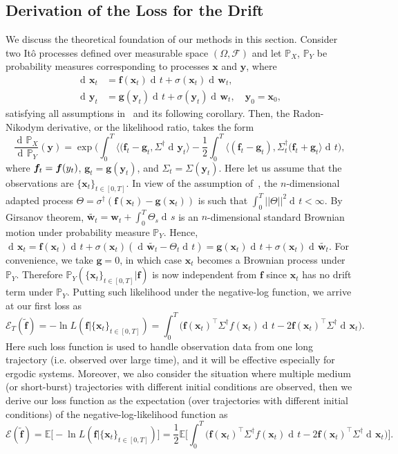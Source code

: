\documentclass[11pt]{article} %
\def\ry{{\textnormal{y}}}
\def\rvw{{\mathbf{w}}}
\def\rvx{{\mathbf{x}}}
\def\rvy{{\mathbf{y}}}
\def\vf{{\bm{f}}}
\def\vg{{\bm{g}}}
\newcommand{\E}{\mathbb{E}}
\DeclareMathOperator{\dif}{d \!}        %
\newcommand{\inp}[1]{\langle #1 \rangle}
\newcommand{\norm}[1]{||#1||}
\newcommand{\loss}{\mathcal{E}}
\begin{document}
\subsection{Derivation of the Loss for the Drift}\label{sec:theory}
%
We discuss the theoretical foundation of our methods in this section. Consider two It\^o processes defined over measurable space $(\Omega, \mathcal{F})$ and let $\mathbb{P}_X$, $\mathbb{P}_Y$ be probability measures corresponding to processes $\rvx$ and $\rvy$, where
\[
\begin{aligned}
  \dif \rvx_t &= \vf(\rvx_t)\dif t + \sigma(\rvx_t)\dif \rvw_t, \\
  \dif \rvy_t &= \vg(\rvy_t)\dif t + \sigma(\rvy_t)\dif \rvw_t, \quad \rvy_0 = \rvx_0,
\end{aligned}
\]
satisfying all assumptions in~\citep[Theorem~7.18]{liptser2001statistics} and its following corollary. Then, the Radon-Nikodym derivative, or the likelihood ratio, takes the form
\begin{equation}
\frac{\dif \mathbb{P}_X}{\dif \mathbb{P}_Y}(\rvy) = \exp \Big( \int_0^T \inp{(\vf_t - \vg_t, \Sigma^{\dagger}\dif \rvy_t} -\frac{1}{2} \int_0^T \inp{(\vf_t - \vg_t), \Sigma_t^{\dagger} (\vf_t + \vg_t}\dif t\Big),
\end{equation}
where $\vf_t = \vf(\ry_t)$, $\vg_t = \vg(\rvy_t)$, and $\Sigma_t = \Sigma(\rvy_t)$. Here let us assume that the observations are $\{\rvx_t\}_{t \in [0, T]}$. In view of the assumption of~\citep[Theorem~7.18]{liptser2001statistics}, the  $n$-dimensional adapted process $\Theta = \sigma^{\dagger}(\vf(\rvx_t) - \vg(\rvx_t))$  is such that $\int_0^T \norm{\Theta}^2\dif t < \infty$. By Girsanov theorem, $\widetilde{\rvw_t} = \rvw_t + \int_0^T \Theta_s \dif s$ is an $n$-dimensional standard Brownian motion under probability measure $\mathbb{P}_Y$. Hence,  $\dif\rvx_t = \vf(\rvx_t)\dif t + \sigma(\rvx_t)(\dif \tilde{\rvw_t} - \Theta_t \dif t) = \vg(\rvx_t)\dif t + \sigma(\rvx_t)\dif \tilde{\rvw_t}$. For convenience,  we take $\vg=0$, in which case $\rvx_t$ becomes a Brownian process under $\mathbb{P}_Y$. Therefore $\mathbb{P}_Y(\{\rvx_t\}_{t \in [0, T]} | \vf)$ is now independent from $\vf$ since $\rvx_t$ has no drift term under $\mathbb{P}_Y$. Putting such likelihood under the negative-log function, we arrive at our first loss as
\[
\loss_T(\tilde\vf) = -\ln{L(\vf|\{\rvx_t\}_{t \in [0, T]})} = \int_0^T\big(\vf(\rvx_t)^\intercal \Sigma^{\dagger} f(\rvx_t)\dif t - 2\vf(\rvx_t)^\intercal \Sigma^{\dagger}\dif\rvx_t\big).
\]
Here such loss function is used to handle observation data from one long trajectory (i.e. observed over large time), and it will be effective especially for ergodic systems.  Moreover, we also consider the situation where multiple medium (or short-burst) trajectories with different initial conditions are observed, then we derive our loss function as the expectation (over trajectories with different initial conditions) of the negative-log-likelihood function as
\[
\loss(\tilde\vf) = \E\big[-\ln{L(\vf|\{\rvx_t\}_{t \in [0, T]})}\big] = \frac{1}{2}\E\big[\int_0^T\big(\vf(\rvx_t)^\intercal \Sigma^{\dagger} f(\rvx_t)\dif t - 2\vf(\rvx_t)^\intercal \Sigma^{\dagger}\dif\rvx_t\big)\big].
\]
%
\end{document}
